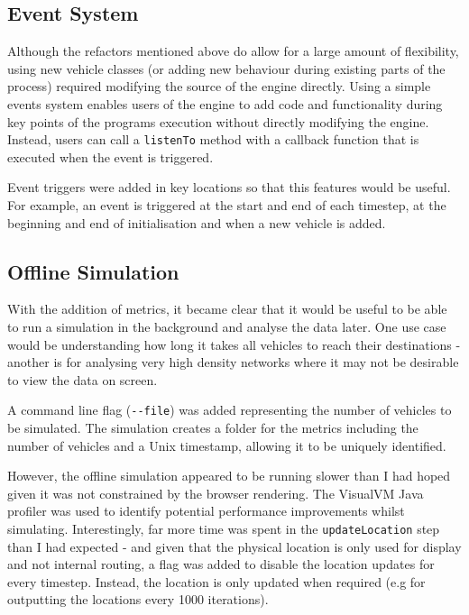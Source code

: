 \documentclass[ %
                    author={Alexander Hill},
                supervisor={Dr. Benjamin Sach},
                    degree={MEng},
                     title={MARMOSET},
                  subtitle={Multi-Agent Route Management using Online Simulation for Efficient Transportation},
                      type={research},
                      year={2016} ]{dissertation}
\begin{document}
\subsection{Event System}

Although the refactors mentioned above do allow for a large amount of
flexibility, using new vehicle classes (or adding new behaviour during existing
parts of the process) required modifying the source of the engine directly.
Using a simple events system enables users of the engine to add code and
functionality during key points of the programs execution without directly
modifying the engine. Instead, users can call a \texttt{listenTo} method with a
callback function that is executed when the event is triggered.

Event triggers were added in key locations so that this features would be
useful. For example, an event is triggered at the start and end of each
timestep, at the beginning and end of initialisation and when a new vehicle is
added.

\subsection{Offline Simulation}

With the addition of metrics, it became clear that it would be useful to be able
to run a simulation in the background and analyse the data later. One use case
would be understanding how long it takes all vehicles to reach their
destinations - another is for analysing very high density networks where it may
not be desirable to view the data on screen.

A command line flag (\texttt{-{}-file}) was added representing the number of
vehicles to be simulated. The simulation creates a folder for the metrics
including the number of vehicles and a Unix timestamp, allowing it to be
uniquely identified.

However, the offline simulation appeared to be running slower than I had hoped
given it was not constrained by the browser rendering. The VisualVM Java
profiler was used to identify potential performance improvements whilst
simulating. Interestingly, far more time was spent in the
\texttt{updateLocation} step than I had expected - and given that the physical
location is only used for display and not internal routing, a flag was added to
disable the location updates for every timestep. Instead, the location is only
updated when required (e.g for outputting the locations every 1000 iterations).
\end{document}
